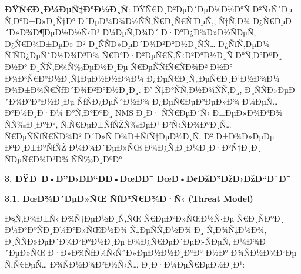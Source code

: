 \documentclass[]{article}
\begin{document}
\textbf{ÐŸÑ€Ð¸Ð¼ÐµÑ‡Ð°Ð½Ð¸Ñ}: ÐŸÑ€Ð¸Ð²ÐµÐ´ÐµÐ½Ð½Ð°Ñ Ð²Ñ‹ÑˆÐµ Ñ‚Ð°Ð±Ð»Ð¸Ñ†Ð° Ð´ÐµÐ¼Ð¾Ð½ÑÑ‚Ñ€Ð¸Ñ€ÑƒÐµÑ‚, Ñ‡Ñ‚Ð¾ Ð¿Ñ€ÐµÐ´Ð»Ð¾Ð¶ÐµÐ½Ð½Ñ‹Ð¹ Ð¼ÐµÑ‚Ð¾Ð´ Ð·Ð°Ð¿Ð¾Ð»Ð½ÑÐµÑ‚ Ð¿Ñ€Ð¾Ð±ÐµÐ» Ð² Ð¸ÑÑÐ»ÐµÐ´Ð¾Ð²Ð°Ð½Ð¸ÑÑ… Ð¿ÑƒÑ‚ÐµÐ¼ ÑƒÑÐ¿ÐµÑˆÐ½Ð¾Ð³Ð¾ Ñ€Ð°Ð·Ð²ÐµÑ€Ñ‚Ñ‹Ð²Ð°Ð½Ð¸Ñ Ð°Ñ‚Ð°ÐºÐ¸ Ð½Ð° Ð¸ÑÑ‚Ð¾Ñ‰ÐµÐ½Ð¸Ðµ Ñ€ÐµÑÑƒÑ€ÑÐ¾Ð² Ð½Ð° Ð¾Ð³Ñ€Ð°Ð½Ð¸Ñ‡ÐµÐ½Ð½Ð¾Ð¼ Ð¿ÐµÑ€Ð¸Ñ„ÐµÑ€Ð¸Ð¹Ð½Ð¾Ð¼ Ð¾Ð±Ð¾Ñ€ÑƒÐ´Ð¾Ð²Ð°Ð½Ð¸Ð¸. Ð’ Ñ‡Ð°ÑÑ‚Ð½Ð¾ÑÑ‚Ð¸, Ð¸ÑÑÐ»ÐµÐ´Ð¾Ð²Ð°Ð½Ð¸Ðµ ÑƒÑÐ¿ÐµÑˆÐ½Ð¾ Ð¿ÐµÑ€ÐµÐ²ÐµÐ»Ð¾ Ð¼ÐµÑ…Ð°Ð½Ð¸Ð·Ð¼ Ð°Ñ‚Ð°ÐºÐ¸ NMS Ð¸Ð· ÑÑ€ÐµÐ´Ñ‹ Ð±ÐµÐ»Ð¾Ð³Ð¾ ÑÑ‰Ð¸ÐºÐ°, Ñ‚Ñ€ÐµÐ±ÑƒÑŽÑ‰ÐµÐ¹ Ð²Ñ‹ÑÐ¾ÐºÐ¸Ñ… Ñ€ÐµÑÑƒÑ€ÑÐ¾Ð² Ð´Ð»Ñ Ð¾Ð±ÑƒÑ‡ÐµÐ½Ð¸Ñ, Ð² Ð±Ð¾Ð»ÐµÐµ Ð³Ð¸Ð±ÐºÑƒÑŽ Ð¼Ð¾Ð´ÐµÐ»ÑŒ Ð¾Ð¿Ñ‚Ð¸Ð¼Ð¸Ð·Ð°Ñ†Ð¸Ð¸ ÑÐµÑ€Ð¾Ð³Ð¾ ÑÑ‰Ð¸ÐºÐ°.\textbf{\hfill\break
}

\textbf{3. ÐŸÐ Ð•Ð”Ð›ÐÐ“ÐÐ•ÐœÐÐ¯ ÐœÐ•Ð¢ÐžÐ”ÐžÐ›ÐžÐ“Ð˜Ð¯}

\textbf{3.1. ÐœÐ¾Ð´ÐµÐ»ÑŒ ÑƒÐ³Ñ€Ð¾Ð·Ñ‹ (Threat Model)}

Ð§Ñ‚Ð¾Ð±Ñ‹ Ð¾Ñ†ÐµÐ½Ð¸Ñ‚ÑŒ Ñ€ÐµÐ°Ð»ÑŒÐ½Ñ‹Ðµ Ñ€Ð¸ÑÐºÐ¸ Ð¼Ð°ÐºÑÐ¸Ð¼Ð°Ð»ÑŒÐ½Ð¾ Ñ‡ÐµÑÑ‚Ð½Ð¾ Ð¸ Ñ‚Ð¾Ñ‡Ð½Ð¾, Ð¸ÑÑÐ»ÐµÐ´Ð¾Ð²Ð°Ð½Ð¸Ðµ Ð¾Ð¿Ñ€ÐµÐ´ÐµÐ»ÑÐµÑ‚ Ð¼Ð¾Ð´ÐµÐ»ÑŒ Ð·Ð»Ð¾ÑƒÐ¼Ñ‹ÑˆÐ»ÐµÐ½Ð½Ð¸ÐºÐ° Ð½Ð° Ð¾ÑÐ½Ð¾Ð²Ðµ Ñ‚Ñ€ÐµÑ… Ð¾ÑÐ½Ð¾Ð²Ð½Ñ‹Ñ… Ð¸Ð·Ð¼ÐµÑ€ÐµÐ½Ð¸Ð¹:
\end{document}
